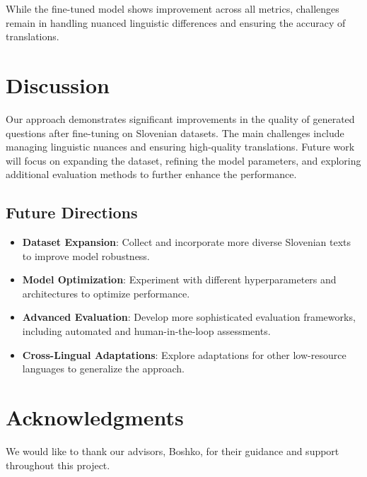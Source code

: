 \documentclass[fleqn,moreauthors,10pt]{ds_report}
\begin{document}
While the fine-tuned model shows improvement across all metrics, challenges remain in handling nuanced linguistic differences and ensuring the accuracy of translations.



\section*{Discussion}
Our approach demonstrates significant improvements in the quality of generated questions after fine-tuning on Slovenian datasets. The main challenges include managing linguistic nuances and ensuring high-quality translations. Future work will focus on expanding the dataset, refining the model parameters, and exploring additional evaluation methods to further enhance the performance.

\subsection*{Future Directions}
\begin{itemize}[noitemsep]
    \item \textbf{Dataset Expansion}: Collect and incorporate more diverse Slovenian texts to improve model robustness.
    \item \textbf{Model Optimization}: Experiment with different hyperparameters and architectures to optimize performance.
    \item \textbf{Advanced Evaluation}: Develop more sophisticated evaluation frameworks, including automated and human-in-the-loop assessments.
    \item \textbf{Cross-Lingual Adaptations}: Explore adaptations for other low-resource languages to generalize the approach.
\end{itemize}



\section*{Acknowledgments}
We would like to thank our advisors, Boshko, for their guidance and support throughout this project.




\end{document}
